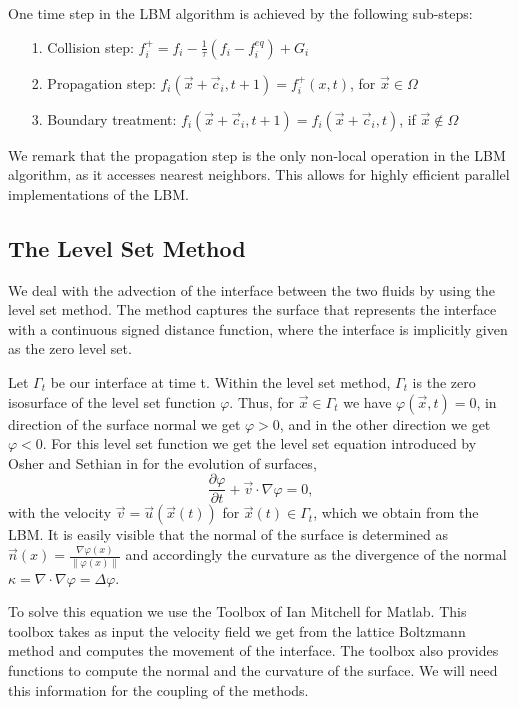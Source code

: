 \documentclass[final,leqno,onefignum,onetabnum]{siamltexmm}
\begin{document}
One time step in the LBM algorithm is achieved by the following sub-steps:
\begin{itemize}
	\item[1. ] Collision step: $f_i^+ = f_i - \frac1\tau(f_i - f_i ^{eq}) + G_i$
	\item[2. ] Propagation step: $f_i(\vec{x}+\vec c_i ,t+1) = f_i^+(x,t)$, for $\vec{x} \in \Omega$
	\item[3. ] Boundary treatment: $f_i(\vec{x}+\vec c_i ,t+1) = f_i(\vec{x}+\vec c_i ,t)$, if $\vec{x} \notin \Omega$
\end{itemize}

We remark that the propagation step is the only non-local operation in the LBM algorithm, as it accesses nearest neighbors. This allows for highly efficient parallel implementations of the LBM.
\subsection{The Level Set Method}
We deal with the advection of the interface between the two fluids by using the level set method. The method captures the surface that represents the interface with a continuous signed distance function, where the interface is implicitly given as the zero level set.

Let $\Gamma_t$ be our interface at time t. Within the level set method, $\Gamma_t$ is the zero isosurface of the level set function $\varphi$. Thus, for $\vec x \in \Gamma_t$ we have $\varphi(\vec x,t) = 0$, in direction of the surface normal we get $\varphi > 0$, and in the other direction we get $\varphi < 0$. For this level set function we get the level set equation introduced by Osher and Sethian in \cite{OsherSethian} for the evolution of surfaces,
\begin{equation}
  \frac{\partial \varphi}{\partial t} + \vec v \cdot \nabla \varphi = 0 \text{,}
\end{equation}
with the velocity $\vec v = \vec u(\vec x(t))$ for $\vec x(t) \in \Gamma_t$, which we obtain from the LBM. It is easily visible that the normal of the surface is determined as $\vec n(x) = \frac{\nabla \varphi(x)}{\|\varphi(x)\|}$ and accordingly the curvature as the divergence of the normal $\kappa = \nabla \cdot \nabla \varphi = \Delta \varphi$.

To solve this equation we use the Toolbox of Ian Mitchell \cite{mitchell} for Matlab. This toolbox takes as input the velocity field we get from the lattice Boltzmann method and computes the movement of the interface. The toolbox also provides functions to compute the normal and the curvature of the surface. We will need this information for the coupling of the methods.
\end{document}
